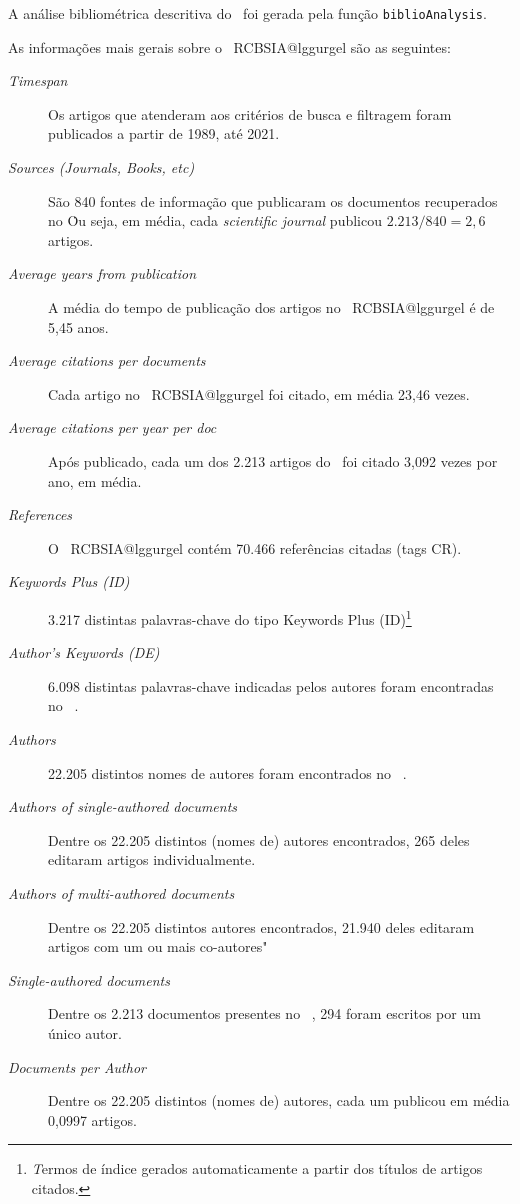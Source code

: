 A análise bibliométrica descritiva do \dataset\ foi gerada pela função \texttt{biblioAnalysis}.

As informações mais gerais sobre o \dataset\   RCBSIA@lggurgel são as seguintes:
\begin{description}
    \item [\textit{Timespan}] Os artigos que atenderam aos critérios de busca e filtragem foram publicados a partir de 1989, até 2021.
    \item [\textit{Sources (Journals, Books, etc)}] São 840 fontes de informação que publicaram os documentos recuperados no \dataset\. Ou seja, em média, cada \textit{scientific journal} publicou $2.213/840=2,6$ artigos.
    \item [\textit{Average years from publication}] A média do tempo de publicação dos artigos no \dataset\   RCBSIA@lggurgel é de 5,45 anos.
    \item [\textit{Average citations per documents}] Cada artigo no \dataset\   RCBSIA@lggurgel foi citado, em média 23,46 vezes.
    \item [\textit{Average citations per year per doc}] Após publicado, cada um dos 2.213 artigos do \dataset\  foi citado 3,092 vezes por ano, em média.
    \item [\textit{References}] O \dataset\   RCBSIA@lggurgel contém 70.466 referências citadas (tags CR).
    \item [\textit{Keywords Plus (ID)}] 3.217 distintas palavras-chave do tipo Keywords Plus (ID)\footnote{\textit Termos de índice gerados automaticamente a partir dos títulos de artigos citados.}
    \item [\textit{Author's Keywords (DE)}] 6.098 distintas palavras-chave indicadas pelos autores foram encontradas no \dataset\  .
    \item [\textit{Authors}] 22.205 distintos nomes de autores foram encontrados no \dataset\ .
    \item [\textit{Authors of single-authored documents}] Dentre os 22.205 distintos (nomes de) autores encontrados, 265 deles editaram artigos individualmente.
    \item [\textit{Authors of multi-authored documents}] Dentre os 22.205 distintos autores encontrados, 21.940 deles editaram artigos com um ou mais co-autores"
    \item [\textit{Single-authored documents}] Dentre os 2.213 documentos presentes no \dataset\ , 294 foram escritos por um único autor.
    \item [\textit{Documents per Author}] Dentre os 22.205 distintos (nomes de) autores, cada um publicou em média 0,0997 artigos.

\end{description}
